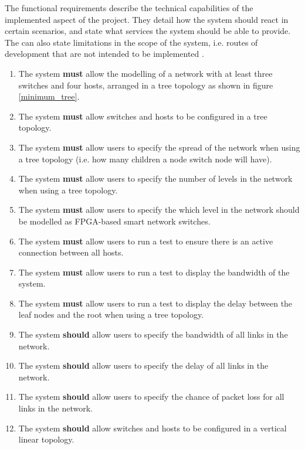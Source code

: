 
The functional requirements describe the technical capabilities of the implemented aspect of the project.
They detail how the system should react in certain scenarios, and state what services the system should be able to provide.
The can also state limitations in the scope of the system, i.e. routes of development that are not intended to be implemented \cite{software_engineering_req_analysis}.

\begin{enumerate}[label=\textbf{F\arabic*:}]
  \item The system \textbf{must} allow the modelling of a network with at least three switches and four hosts, arranged in a tree topology as shown in figure \ref{minimum_tree}.
  \item The system \textbf{must} allow switches and hosts to be configured in a tree topology.
  \item The system \textbf{must} allow users to specify the spread of the network when using a tree topology (i.e. how many children a node switch node will have).
  \item The system \textbf{must} allow users to specify the number of levels in the network when using a tree topology.
  \item The system \textbf{must} allow users to specify the which level in the network should be modelled as FPGA-based smart network switches.
  \item The system \textbf{must} allow users to run a test to ensure there is an active connection between all hosts.
  \item The system \textbf{must} allow users to run a test to display the bandwidth of the system.
  \item The system \textbf{must} allow users to run a test to display the delay between the leaf nodes and the root when using a tree topology.
  \item The system \textbf{should} allow users to specify the bandwidth of all links in the network.
  \item The system \textbf{should} allow users to specify the delay of all links in the network.
  \item The system \textbf{should} allow users to specify the chance of packet loss for all links in the network.
  \item The system \textbf{should} allow switches and hosts to be configured in a vertical linear topology.

\end{enumerate}
